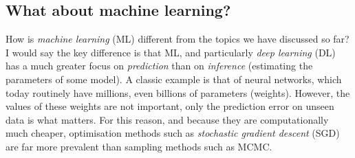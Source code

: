 \documentclass[12pt,dvipsnames]{report}
\renewcommand{\vec}[1]{\boldsymbol{\mathbf{#1}}}
\begin{document}
%

\subsection{What about machine learning?}
How is \emph{machine learning} (ML) different from the topics we have discussed so far? 
I would say the key difference is that ML, and particularly \emph{deep learning} (DL) 
has a much greater focus on \emph{prediction}
than on \emph{inference} (estimating the parameters of some model).
A classic example is that of neural networks, which 
today routinely have millions, even billions of parameters (weights).
However, the values of these weights are not important, only the prediction error 
on unseen data is what matters. For this reason, and because they are computationally 
much cheaper, optimisation methods such as 
\emph{stochastic gradient descent} (SGD)
are far more prevalent than sampling methods such as MCMC.
\end{document}
